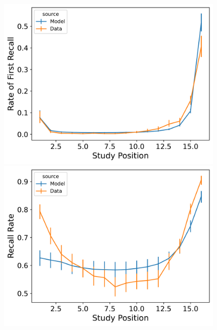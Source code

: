 \documentclass[
  letterpaper,
  11pt,
  english,
  singlespacing,
  headsepline]{MastersDoctoralThesis}
\begin{document}
\begin{figure}
\begin{minipage}{0.33\linewidth}
\includegraphics{icmr_figures/HealyKahana2014_InstanceCMR_Model_Fitting_pfr-1.png}\end{minipage}%
%
\begin{minipage}{0.33\linewidth}
\includegraphics{icmr_figures/HealyKahana2014_InstanceCMR_Model_Fitting_spc-1.png}\end{minipage}%
\newline
\begin{minipage}{0.33\linewidth}

\end{minipage}
\end{figure}
\end{document}
